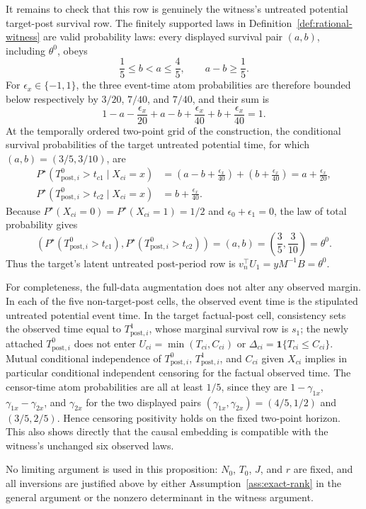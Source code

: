 It remains to check that this row is genuinely the witness's untreated potential target-post survival row.  The finitely supported laws in Definition~\ref{def:rational-witness} are valid probability laws: every displayed survival pair \((a,b)\), including \(\theta^0\), obeys
\[
\frac15\le b<a\le\frac45,
\qquad a-b\ge\frac15.
\]
For \(\epsilon_x\in\{-1,1\}\), the three event-time atom probabilities are therefore bounded below respectively by \(3/20\), \(7/40\), and \(7/40\), and their sum is
\[
1-a-\frac{\epsilon_x}{20}
+a-b+\frac{\epsilon_x}{40}
+b+\frac{\epsilon_x}{40}=1.
\]
At the temporally ordered two-point grid of the construction, the conditional survival probabilities of the target untreated potential time, for which \((a,b)=(3/5,3/10)\), are
\[
\begin{aligned}
P^\star\!\left(T^0_{\mathrm{post},i}>t_{c1}\mid X_{ci}=x\right)
&=\left(a-b+\frac{\epsilon_x}{40}\right)
+\left(b+\frac{\epsilon_x}{40}\right)
=a+\frac{\epsilon_x}{20},\\
P^\star\!\left(T^0_{\mathrm{post},i}>t_{c2}\mid X_{ci}=x\right)
&=b+\frac{\epsilon_x}{40}.
\end{aligned}
\]
Because \(P^\star(X_{ci}=0)=P^\star(X_{ci}=1)=1/2\) and \(\epsilon_0+\epsilon_1=0\), the law of total probability gives
\[
\left(
P^\star(T^0_{\mathrm{post},i}>t_{c1}),
P^\star(T^0_{\mathrm{post},i}>t_{c2})
\right)
=(a,b)
=\left(\frac35,\frac3{10}\right)
=\theta^0.
\]
Thus the target's latent untreated post-period row is \(v_n^\top U_1=yM^{-1}B=\theta^0\).

For completeness, the full-data augmentation does not alter any observed margin.  In each of the five non-target-post cells, the observed event time is the stipulated untreated potential event time.  In the target factual-post cell, consistency sets the observed time equal to \(T^1_{\mathrm{post},i}\), whose marginal survival row is \(s_1\); the newly attached \(T^0_{\mathrm{post},i}\) does not enter \(U_{ci}=\min(T_{ci},C_{ci})\) or \(\Delta_{ci}=\mathbf 1\{T_{ci}\le C_{ci}\}\).  Mutual conditional independence of \(T^0_{\mathrm{post},i}\), \(T^1_{\mathrm{post},i}\), and \(C_{ci}\) given \(X_{ci}\) implies in particular conditional independent censoring for the factual observed time.  The censor-time atom probabilities are all at least \(1/5\), since they are \(1-\gamma_{1x}\), \(\gamma_{1x}-\gamma_{2x}\), and \(\gamma_{2x}\) for the two displayed pairs \((\gamma_{1x},\gamma_{2x})=(4/5,1/2)\) and \((3/5,2/5)\).  Hence censoring positivity holds on the fixed two-point horizon.  This also shows directly that the causal embedding is compatible with the witness's unchanged six observed laws.

No limiting argument is used in this proposition: \(N_0\), \(T_0\), \(J\), and \(r\) are fixed, and all inversions are justified above by either Assumption~\ref{ass:exact-rank} in the general argument or the nonzero determinant in the witness argument.
